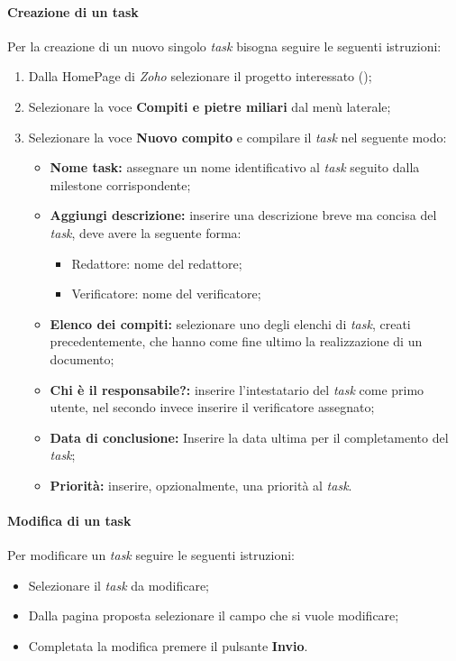 \paragraph{Creazione di un task}
Per la creazione di un nuovo singolo \textit{task} bisogna seguire le seguenti 
istruzioni:
\begin{enumerate}
  \item Dalla HomePage di \textit{Zoho} selezionare il progetto interessato (\progetto);
  \item Selezionare la voce \textbf{Compiti e pietre miliari} dal menù laterale;
  \item Selezionare la voce \textbf{Nuovo compito} e compilare il \textit{task} nel 
  seguente modo:
    \begin{itemize}
      \item \textbf{Nome task:} assegnare un nome identificativo al \textit{task} seguito dalla milestone corrispondente;
      \item \textbf{Aggiungi descrizione:} inserire una descrizione breve ma 
      concisa del \textit{task}, deve avere la seguente forma:
        \begin{itemize}
          \item Redattore: nome del redattore;
          \item Verificatore: nome del verificatore;
        \end{itemize}
      \item \textbf{Elenco dei compiti:} selezionare uno degli elenchi di 
      \textit{task}, creati precedentemente, che hanno come fine ultimo la realizzazione di un 
      documento;
      \item \textbf{Chi è il responsabile?:} inserire l'intestatario del \textit{task} 
      come primo utente, nel secondo invece inserire il verificatore assegnato;
      \item \textbf{Data di conclusione:} Inserire la data ultima per il 
      completamento del \textit{task};
     \item \textbf{Priorità:} inserire, opzionalmente, una priorità al \textit{task}.
    \end{itemize}
\end{enumerate}


\paragraph{Modifica di un task}
Per modificare un \textit{task} seguire le seguenti istruzioni:
\begin{itemize}
  \item Selezionare il \textit{task} da modificare;
  \item Dalla pagina proposta selezionare il campo che si vuole modificare;
  \item Completata la modifica premere il pulsante \textbf{Invio}.
\end{itemize}

